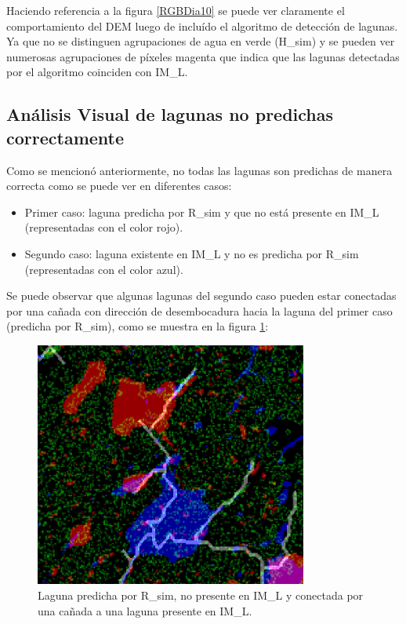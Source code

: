\documentclass[10pt,a4paper, twoside]{report}
\begin{document}
Haciendo referencia a la figura \ref{RGBDia10} se puede ver claramente el comportamiento del DEM luego de incluído el algoritmo de detección de lagunas. Ya que no se distinguen agrupaciones de agua en verde (H\_sim) y se pueden ver numerosas agrupaciones de píxeles magenta que indica que las lagunas detectadas por el algoritmo coinciden con IM\_L.

\subsection{Análisis Visual de lagunas no predichas correctamente}
\label{obscorreccionlagunas}

Como se mencionó anteriormente, no todas las lagunas son predichas de manera correcta como se puede ver en diferentes casos:

\begin{itemize}
	\item Primer caso: laguna predicha por R\_sim y que no está presente en IM\_L (representadas con el color rojo).
	\item Segundo caso: laguna existente en IM\_L y no es predicha por R\_sim (representadas con el color azul). 
\end{itemize}

Se puede observar que algunas lagunas del segundo caso pueden estar conectadas por una cañada con dirección de desembocadura hacia la laguna del primer caso (predicha por R\_sim), como se muestra en la figura \ref{LagunaProblema1}: 

\begin{figure}[!htb]
   \centering      
   \includegraphics[width=0.8\textwidth]{imagenes/LagunaProblema1.jpg}
 \caption{Laguna predicha por R\_sim, no presente en IM\_L y conectada por una cañada a una laguna presente en IM\_L.}
 \label{LagunaProblema1}
\end{figure}
\end{document}
